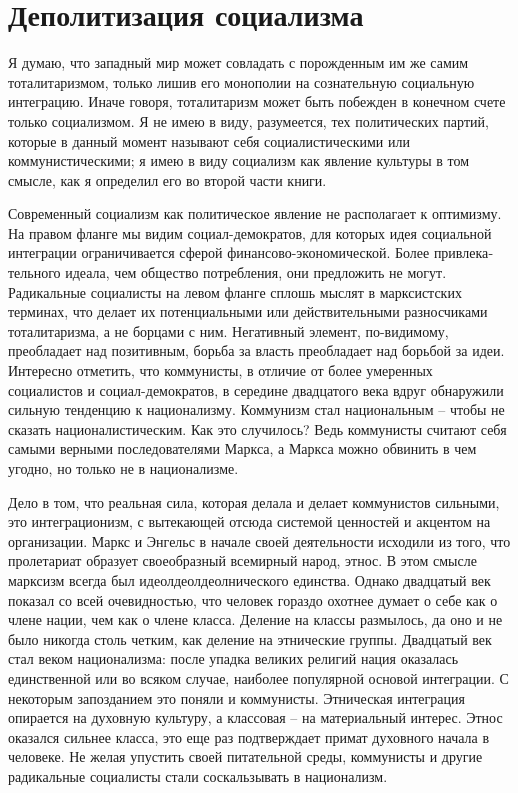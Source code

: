 \documentclass{book}
\begin{document}
{\section{Деполитизация социализма}

Я думаю, что западный мир может совладать с порожденным им же самим тоталитаризмом, только лишив его монополии на сознательную социальную интеграцию. Иначе говоря, тота­литаризм может быть побежден в конечном счете только со­циализмом. Я не имею в виду, разумеется, тех политических партий, которые в данный момент называют себя социалисти­ческими или коммунистическими; я имею в виду социализм как явление культуры в том смысле, как я определил его во второй части книги.

Современный социализм как политическое явление не рас­полагает к оптимизму. На правом фланге мы видим социал-демократов, для которых идея социальной интеграции ограни­чивается сферой финансово-экономической. Более привлека­тельного идеала, чем общество потребления, они предложить не могут. Радикальные социалисты на левом фланге сплошь мыс­лят в марксистских терминах, что делает их потенциальными или действительными разносчиками тоталитаризма, а не борца­ми с ним. Негативный элемент, по-видимому, преобладает над позитивным, борьба за власть преобладает над борьбой за идеи.
Интересно отметить, что коммунисты, в отличие от более умеренных социалистов и социал-демократов, в середине двад­цатого века вдруг обнаружили сильную тенденцию к национа­лизму. Коммунизм стал национальным -- чтобы не сказать на­ционалистическим. Как это случилось? Ведь коммунисты счита­ют себя самыми верными последователями Маркса, а Маркса можно обвинить в чем угодно, но только не в национализме.

Дело в том, что реальная сила, которая делала и делает ком­мунистов сильными, это интеграционизм, с вытекающей отсю­да системой ценностей и акцентом на организации. Маркс и Эн­гельс в начале своей деятельности исходили из того, что проле­тариат образует своеобразный всемирный народ, этнос. В этом смысле марксизм всегда был идеолдеолдеолнического единства. Однако двадцатый век показал со всей очевидностью, что чело­век гораздо охотнее думает о себе как о члене нации, чем как о члене класса. Деление на классы размылось, да оно и не было никогда столь четким, как деление на этнические группы. Двадцатый век стал веком национализма: после упадка великих религий нация оказалась единственной или во всяком случае, наиболее популярной основой интеграции. С некоторым за­позданием это поняли и коммунисты. Этническая интеграция опирается на духовную культуру, а классовая -- на материаль­ный интерес. Этнос оказался сильнее класса, это еще раз подт­верждает примат духовного начала в человеке. Не желая упу­стить своей 
питательной среды, коммунисты и другие радикаль­ные социалисты стали соскальзывать в национализм.

}
\end{document}
